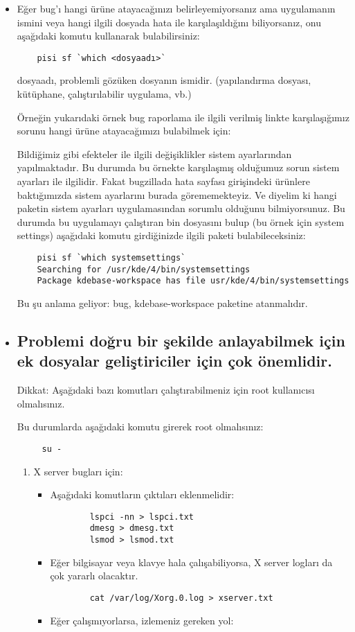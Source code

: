 \documentclass[a4paper,10pt]{article}
\begin{document}
\begin{itemize}
  	\item Eğer bug'ı hangi ürüne atayacağınızı belirleyemiyorsanız ama uygulamanın ismini veya hangi ilgili dosyada hata ile karşılaşıldığını biliyorsanız, onu aşağıdaki komutu kullanarak bulabilirsiniz:
	\begin{verbatim}
	pisi sf `which <dosyaadı>`
	\end{verbatim}
	dosyaadı, problemli gözüken dosyanın ismidir. (yapılandırma dosyası, kütüphane, çalıştırılabilir uygulama, vb.)

	Örneğin yukarıdaki örnek bug raporlama ile ilgili verilmiş linkte karşılaşığımız sorunu hangi ürüne atayacağımızı bulabilmek için:

	Bildiğimiz gibi efekteler ile ilgili değişiklikler sistem ayarlarından yapılmaktadır. Bu durumda bu örnekte karşılaşmış olduğumuz sorun sistem ayarları ile ilgilidir. Fakat bugzillada hata sayfası girişindeki ürünlere baktığımızda sistem ayarlarını burada  görememekteyiz. Ve diyelim ki hangi paketin sistem ayarları uygulamasından sorumlu olduğunu bilmiyorsunuz. Bu durumda bu uygulamayı çalıştıran bin dosyasını bulup (bu örnek için system settings) aşağıdaki komutu girdiğinizde ilgili paketi bulabileceksiniz:
	\begin{verbatim}
	pisi sf `which systemsettings`
	Searching for /usr/kde/4/bin/systemsettings
	Package kdebase-workspace has file usr/kde/4/bin/systemsettings
	\end{verbatim}
	Bu şu anlama geliyor: bug, kdebase-workspace paketine atanmalıdır.

  \item \subsection*{Problemi doğru bir şekilde anlayabilmek için ek dosyalar geliştiriciler için çok önemlidir.}

	Dikkat: Aşağıdaki bazı komutları çalıştırabilmeniz için root kullanıcısı olmalısınız. 

	Bu durumlarda aşağıdaki komutu girerek root olmalısınız:
	\begin{verbatim}
	 su -
	\end{verbatim}

	\begin{enumerate}
	\item X server bugları için:
	\begin{itemize}
		\item Aşağıdaki komutların çıktıları eklenmelidir:
		\begin{verbatim}
		lspci -nn > lspci.txt
		dmesg > dmesg.txt
		lsmod > lsmod.txt
		\end{verbatim}
		\item Eğer bilgisayar veya klavye hala çalışabiliyorsa, X server logları da çok yararlı olacaktır.
		\begin{verbatim}
		cat /var/log/Xorg.0.log > xserver.txt
		\end{verbatim}
		\item Eğer çalışmıyorlarsa, izlemeniz gereken yol:


\end{itemize}
\end{enumerate}
\end{itemize}
\end{document}
